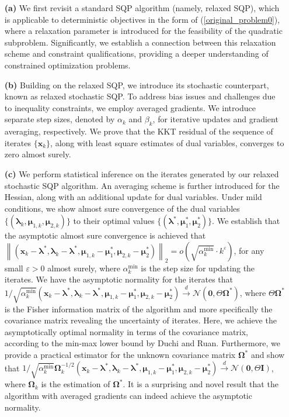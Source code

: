 \documentclass[aos]{imsart}
\numberwithin{equation}{section}
\theoremstyle{plain}
\begin{document}
\begin{enumerate}
    \item[\textbf{(a)}] We first revisit a standard SQP algorithm (namely, relaxed SQP), which is applicable to deterministic objectives in the form of (\ref{original_problem0}), where a relaxation parameter is introduced for the feasibility of the quadratic subproblem. Significantly, we establish a connection between this relaxation scheme and constraint qualifications, providing a deeper understanding of constrained optimization problems.
    

    \item[\textbf{(b)}] Building on the relaxed SQP, we introduce its stochastic counterpart, known as relaxed stochastic SQP. To address bias issues and challenges due to inequality constraints, we employ averaged gradients. We introduce separate step sizes, denoted by  $\alpha_k$ and $\beta_k$, for iterative updates and gradient averaging, respectively. We prove that the KKT residual of the sequence of iterates  $\{\bm{x}_k\}$, along with least square estimates of dual variables, converges to zero almost surely. 

    \item[\textbf{(c)}] We perform statistical inference on the iterates generated by our relaxed stochastic SQP algorithm. An averaging scheme is further introduced for the Hessian, along with an additional update for dual variables. Under mild conditions, we show almost sure convergence of the dual variables $\{(\bm{\lambda}_{k}, \bm{\mu}_{1,k}, \bm{\mu}_{2,k})\}$ to their optimal values $\{(\bm{\lambda}^{*}, \bm{\mu}_{1}^{*}, \bm{\mu}_{2}^{*})\}$.  
    We establish that the asymptotic almost sure convergence is achieved that $\left\| (\bm{x}_k - \bm{\lambda}^{*}, \bm{\lambda}_{k} - \bm{\lambda}^{*}, \bm{\mu}_{1,k} - \bm{\mu}_1^{*}, \bm{\mu}_{2,k} - \bm{\mu}_2^{*}) \right\|_2 = o\left( \sqrt{\alpha_k^{\text{min}}} \cdot k^{\varepsilon} \right)$, for any small $\varepsilon > 0$ almost surely, where $\alpha_k^{\text{min}}$ is the step size for updating the iterates. We have the asymptotic normality for the iterates that $1/\sqrt{\alpha_k^{\text{min}}}(\bm{x}_k - \bm{\lambda}^{*}, \bm{\lambda}_{k} - \bm{\lambda}^{*}, \bm{\mu}_{1,k} - \bm{\mu}_1^{*}, \bm{\mu}_{2,k} - \bm{\mu}_2^{*}) \stackrel{d}{\longrightarrow} \mathcal{N} \left( \bm{0}, \Theta \bm{\Omega}^{*} \right)$, where $\Theta \bm{\Omega}^{*}$ is the Fisher information matrix of the algorithm and more specifically the covariance matrix revealing the uncertainty of iterates. Here, we achieve the asymptotically optimal normality in terms of the covariance matrix, according to the min-max lower bound by Duchi and Ruan. Furthermore, we provide a practical estimator for the unknown covariance matrix $ \bm{\Omega}^{*}$ and show that $1/\sqrt{\alpha_k^{\text{min}}} \bm{\Omega}_k^{-1/2}(\bm{x}_k - \bm{\lambda}^{*}, \bm{\lambda}_{k} - \bm{\lambda}^{*}, \bm{\mu}_{1,k} - \bm{\mu}_1^{*}, \bm{\mu}_{2,k} - \bm{\mu}_2^{*}) \stackrel{d}{\longrightarrow} \mathcal{N} \left( \bm{0}, \Theta \bm{I} \right)$, where $\bm{\Omega}_k$ is the estimation of $\bm{\Omega}^{*}$. It is a surprising and novel result that the algorithm with averaged gradients can indeed achieve the asymptotic normality.
\end{enumerate}
\end{document}
